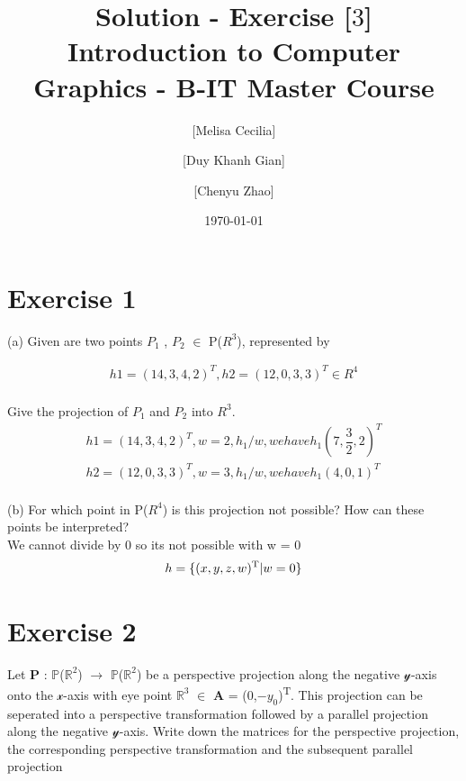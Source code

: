 \documentclass[10pt,a4paper]{article}
\begin{document}
\title{Solution - Exercise [$3$]\\
\small{Introduction to Computer Graphics - B-IT Master Course}}
\author{ [Melisa Cecilia] \and [Duy Khanh Gian] \and [Chenyu Zhao]}
\date{\today}

\maketitle
\section*{Exercise 1}

(a) Given are two points $P_1$ , $P_2$ $\in$ P($R^{3}$), represented by

\begin{gather*}
h1 = (14,3,4,2)^{T} , h2=(12,0,3,3)^{T} \in R^{4}  \\
\end{gather*}

Give the projection of $P_1$ and $P_2$ into $R^{3}$. \\

\begin{gather*}
h1 = (14,3,4,2)^{T} ,  w=2 , h_1/w, we have h_1(7,\dfrac{3}{2},2)^{T}\\
h2 = (12,0,3,3)^{T} ,  w=3 , h_1/w, we have h_1(4,0,1)^{T}\\
\end{gather*}

(b) For which point in P($R^{4}$) is this projection not possible? How can these points be interpreted?\\

We cannot divide by 0 so its not possible with w = 0 \\
\begin{gather*}
h=\{(x,y,z,w)\textsuperscript{T}|w=0 \}\\
\end{gather*}


\section*{Exercise 2}

Let $\mathbf{P}$ : $\mathbb{P}$($\mathbb{R}^{2}$)  $\rightarrow$ $\mathbb{P}$($\mathbb{R}^{2}$) be a perspective projection along the negative $\mathcal{y}$-axis onto the $\mathcal{x}$-axis with eye point $\mathbb{R}^{3}$ $\in$ $\mathbf{A}$ = (0,$-y_0$)\textsuperscript{T}. This projection can be seperated into a perspective transformation followed by a parallel projection along the negative $\mathcal{y}$-axis. Write down the matrices for the perspective projection, the corresponding perspective transformation and the subsequent parallel projection\\
\end{document}
